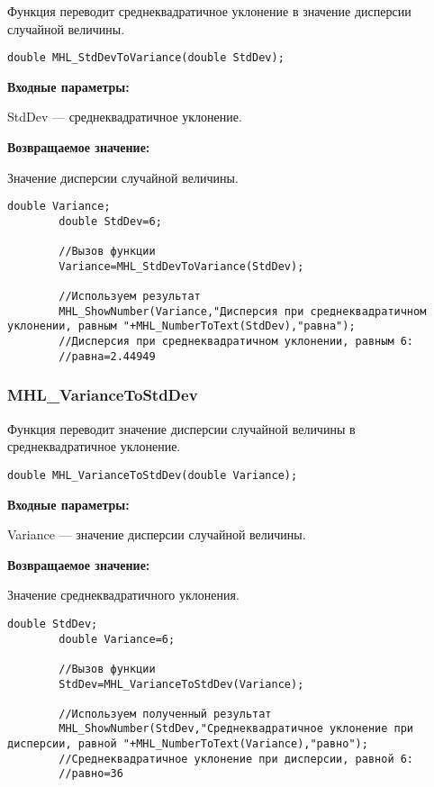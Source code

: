 \documentclass[a4paper,12pt]{article}
\begin{document}
Функция переводит среднеквадратичное уклонение в значение дисперсии случайной величины.


\begin{lstlisting}[label=code_syntax_MHL_StdDevToVariance,caption=Синтаксис]
double MHL_StdDevToVariance(double StdDev);
\end{lstlisting}

\textbf{Входные параметры:}

 StdDev --- среднеквадратичное уклонение.

\textbf{Возвращаемое значение:}

 Значение дисперсии случайной величины.



\begin{lstlisting}[label=code_use_MHL_StdDevToVariance,caption=Пример использования]
        double Variance;
        double StdDev=6;

        //Вызов функции
        Variance=MHL_StdDevToVariance(StdDev);

        //Используем результат
        MHL_ShowNumber(Variance,"Дисперсия при среднеквадратичном уклонении, равным "+MHL_NumberToText(StdDev),"равна");
        //Дисперсия при среднеквадратичном уклонении, равным 6:
        //равна=2.44949
\end{lstlisting}

\subsubsection{MHL\_VarianceToStdDev}\label{MHL_VarianceToStdDev}

Функция переводит значение дисперсии случайной величины в среднеквадратичное уклонение.


\begin{lstlisting}[label=code_syntax_MHL_VarianceToStdDev,caption=Синтаксис]
double MHL_VarianceToStdDev(double Variance);
\end{lstlisting}

\textbf{Входные параметры:}

 Variance --- значение дисперсии случайной величины.

\textbf{Возвращаемое значение:}

 Значение среднеквадратичного уклонения.



\begin{lstlisting}[label=code_use_MHL_VarianceToStdDev,caption=Пример использования]
        double StdDev;
        double Variance=6;

        //Вызов функции
        StdDev=MHL_VarianceToStdDev(Variance);

        //Используем полученный результат
        MHL_ShowNumber(StdDev,"Среднеквадратичное уклонение при дисперсии, равной "+MHL_NumberToText(Variance),"равно");
        //Среднеквадратичное уклонение при дисперсии, равной 6:
        //равно=36
\end{lstlisting}
\end{document}
